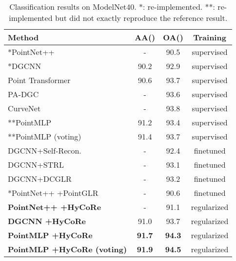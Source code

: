 \documentclass{article}
\begin{document}
\begin{table}
  \caption{Classification results on ModelNet40. *: re-implemented. **: re-implemented but did not exactly reproduce the reference result.}
\setlength\tabcolsep{2pt} 
  \label{class-mn40}
  \centering
  \begin{tabular}{lccc}
    \toprule
Method     & AA()     & OA() & Training \\
    \midrule
    *PointNet++\cite{qi2017pointnet++}    & -  &  90.5 & supervised   \\
    *DGCNN\cite{wang2019dynamic}    & 90.2  &  92.9  & supervised  \\
    Point Transformer \cite{zhao2021point} & 90.6 & 93.7 & supervised \\
    PA-DGC \cite{xu2021paconv}            & - & 93.6 & supervised \\
    CurveNet \cite{xiang2021walk}          & - & 93.8 & supervised \\
    **PointMLP\cite{ma2022rethinking} & 91.2  &   93.4   & supervised \\
    **PointMLP (voting) & 91.4  &   93.7   & supervised \\
    \midrule
    DGCNN+Self-Recon. \cite{sauder2019self}    & - & 92.4 & finetuned \\
    DGCNN+STRL \cite{huang2021spatio}             & - & 93.1 & finetuned \\
    DGCNN+DCGLR \cite{fu2022distillation}             & - & 93.2 & finetuned \\
    *PointNet++ +PointGLR \cite{rao2020global}   & -  &  90.6 & finetuned   \\

    \midrule
    \textbf{PointNet++ +HyCoRe}    & -  &  91.1  & regularized  \\
    \textbf{DGCNN +HyCoRe}    & 91.0  &  93.7 & regularized    \\
    \textbf{PointMLP +HyCoRe} & \textbf{91.7}  &   \textbf{94.3}  & regularized \\
    \textbf{PointMLP +HyCoRe (voting)} & \textbf{91.9}  &   \textbf{94.5} & regularized   \\
    \bottomrule
  \end{tabular}
\end{table}
\end{document}
